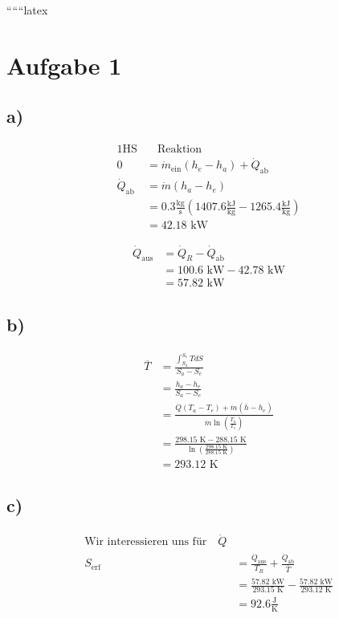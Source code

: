 
``````latex


\section*{Aufgabe 1}

\subsection*{a)}

\begin{align*}
\text{1HS} & \quad \text{Reaktion} \\
0 &= \dot{m}_{\text{ein}} (h_e - h_a) + \dot{Q}_{\text{ab}} \\
\dot{Q}_{\text{ab}} &= \dot{m} (h_a - h_e) \\
&= 0.3 \frac{\text{kg}}{\text{s}} (1407.6 \frac{\text{kJ}}{\text{kg}} - 1265.4 \frac{\text{kJ}}{\text{kg}}) \\
&= 42.18 \text{ kW}
\end{align*}

\begin{align*}
\dot{Q}_{\text{aus}} &= \dot{Q}_R - \dot{Q}_{\text{ab}} \\
&= 100.6 \text{ kW} - 42.78 \text{ kW} \\
&= 57.82 \text{ kW}
\end{align*}

\subsection*{b)}

\begin{align*}
\overline{T} &= \frac{\int_{S_a}^{S_e} T dS}{S_a - S_e} \\
&= \frac{h_a - h_e}{S_a - S_e} \\
&= \frac{\dot{Q} (T_a - T_e) + \dot{m} (\overline{h} - h_e)}{\dot{m} \ln \left( \frac{T_a}{T_e} \right)} \\
&= \frac{298.15 \text{ K} - 288.15 \text{ K}}{\ln \left( \frac{298.15 \text{ K}}{288.15 \text{ K}} \right)} \\
&= 293.12 \text{ K}
\end{align*}

\subsection*{c)}


\begin{align*}
\text{Wir interessieren uns für} \quad \dot{Q} \\
S_{\text{erf}} &= \frac{\dot{Q}_{\text{aus}}}{T_R} + \frac{\dot{Q}_{\text{ab}}}{\overline{T}} \\
&= \frac{57.82 \text{ kW}}{293.15 \text{ K}} - \frac{57.82 \text{ kW}}{293.12 \text{ K}} \\
&= 92.6 \frac{\text{J}}{\text{K}}
\end{align*}

